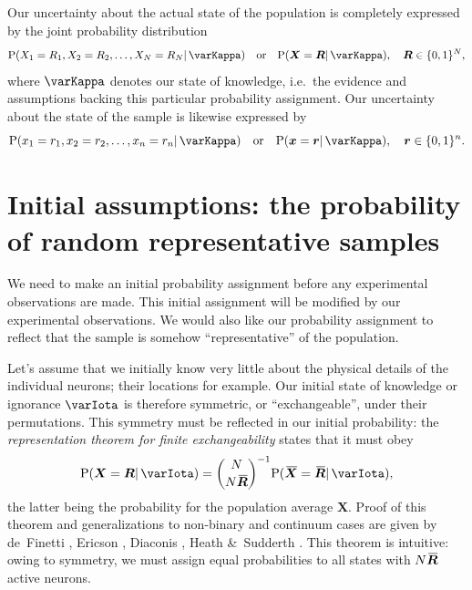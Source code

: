 \documentclass{article}
\theoremstyle{remark}
\theoremstyle{innote}
\newcommand*{\citep}{\parencites}
\renewcommand*{\cite}{\citep}
\newcommand*{\amp}{\&}
\renewcommand*{\|}{\mathpunct{|}}%
\DeclarePairedDelimiter\set{\{}{\}}
\newcommand*{\p}{\mathrm{P}}%
\newcommand*{\ie}{{i.e.}}
\theoremstyle{simple}
\newcommand*{\widebar}[1]{{\mkern1.5mu\skew{2}\overline{\mkern-1.5mu#1\mkern-1.5mu}\mkern 1.5mu}}
\newcommand*{\av}{\widebar} %
\newcommand*{\yxx}{x}%
\newcommand*{\yx}{\bm{\yxx}}%
\newcommand*{\yX}{\bm{X}}%
\newcommand*{\yXf}{\av{\yX}}%
\newcommand*{\yr}{\bm{r}}%
\newcommand*{\yR}{\bm{R}}%
\newcommand*{\yRf}{\av{\yR}}%
\newcommand*{\yH}{\varIota}
\newcommand*{\yHc}{\varKappa}
\begin{document}
Our uncertainty about the actual state of the population is completely
expressed by the joint probability distribution
\begin{equation}
  \label{eq:joint_plaus}
  \p(X_1=R_1, X_2=R_2, \dotsc, X_N=R_N \| \yHc) \quad\text{or}\quad
\p(\yX =\yR \| \yHc), \quad \yR \in \set{0,1}^N,
\end{equation}
where $\yHc$ denotes our state of knowledge, \ie\ the evidence and
assumptions backing this particular probability assignment. Our uncertainty
about the state of the sample is likewise expressed by
\begin{equation}
  \label{eq:sample_plaus}
  \p(x_1=r_1, x_2=r_2, \dotsc, x_n=r_n \| \yHc) \quad\text{or}\quad
\p(\yx =\yr \| \yHc), \quad \yr \in \set{0,1}^n.
\end{equation}



\section{Initial assumptions: the probability of random representative samples}
\label{sec:prob_samples}

We need to make an initial probability assignment before any experimental
observations are
made. %
This initial assignment will be modified by our experimental observations.
We would also like our probability assignment to reflect that the sample is
somehow \enquote{representative} of the population.

Let's assume that we initially know very little about the physical details
of the individual neurons; their locations for example. Our initial state
of knowledge or ignorance $\yH$ is therefore symmetric, or
\enquote{exchangeable}, under their permutations. This symmetry must be
reflected in our initial probability: the \emph{representation theorem for
  finite exchangeability} states that it must obey
\begin{equation}
  \label{eq:joint_plaus_N_homog}
  \p(\yX = \yR \| \yH) = \binom{N}{N\yRf}^{-1} \p(\yXf=\yRf \| \yH),
\end{equation}
the latter being the probability for the population average $\yX$. Proof of
this theorem and generalizations to non-binary and continuum cases are
given by de~Finetti \cite{definetti1959b}, Ericson \cite{ericson1976},
Diaconis \cite{diaconis1977}, Heath \amp\ Sudderth \cite{heathetal1976}.
This theorem is intuitive: owing to symmetry, we must assign equal
probabilities to all states with $N\yRf$ active neurons.
\end{document}
